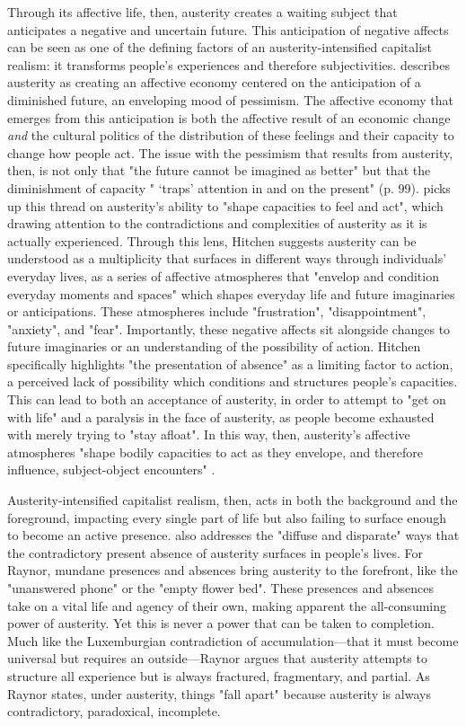 Through its affective life, then, austerity creates a waiting subject that anticipates a negative and uncertain future. This anticipation of negative affects can be seen as one of the defining factors of an austerity-intensified capitalist realism: it transforms people's experiences and therefore subjectivities. \citet{coleman_austerity_2016} describes austerity as creating an affective economy centered on the anticipation of a diminished future, an enveloping mood of pessimism. The affective economy that emerges from this anticipation is both the affective result of an economic change \textit{and} the cultural politics of the distribution of these feelings and their capacity to change how people act. The issue with the pessimism that results from austerity, then, is not only that "the future cannot be imagined as better" but that the diminishment of capacity " `traps' attention in and on the present" (p. 99).  \citet[p. 102]{hitchen_living_2016}  picks up this thread on austerity's ability to "shape  capacities to feel and act", which drawing attention to the contradictions and complexities of austerity as it is actually experienced. Through this lens, Hitchen suggests austerity can be understood as a multiplicity that surfaces in different ways through individuals' everyday lives, as a series of affective atmospheres that "envelop and condition everyday moments and spaces" which shapes everyday life and future imaginaries or anticipations. These atmospheres include "frustration", "disappointment", "anxiety", and "fear". Importantly, these negative affects sit alongside changes to future imaginaries or an understanding of the possibility of action. Hitchen specifically highlights "the presentation of absence" as a limiting factor to action, a perceived lack of possibility which conditions and structures people's capacities. This can lead to both an acceptance of austerity, in order to attempt to "get on with life" and a paralysis in the face of austerity, as people become exhausted with merely trying to "stay afloat". In this way, then, austerity's affective atmospheres "shape bodily capacities to act as they envelope, and therefore influence, subject-object encounters" \citep[p. 117]{hitchen_living_2016}.

Austerity-intensified capitalist realism, then, acts in both the background and the foreground, impacting every single part of life but also failing to surface enough to become an active presence. \citet[p. 195]{raynor_dramatising_2017} also addresses the "diffuse and disparate" ways that the contradictory present absence of austerity surfaces in people's lives. For Raynor, mundane presences and absences bring austerity to the forefront, like the "unanswered phone" or the "empty flower bed". These presences and absences take on a vital life and agency of their own, making apparent the all-consuming power of austerity. Yet this is never a power that can be taken to completion. Much like the Luxemburgian contradiction of accumulation—that it must become universal but requires an outside—Raynor argues that austerity attempts to structure all experience but is always fractured, fragmentary, and partial. As Raynor states, under austerity, things "fall apart" because austerity is always contradictory, paradoxical, incomplete.

